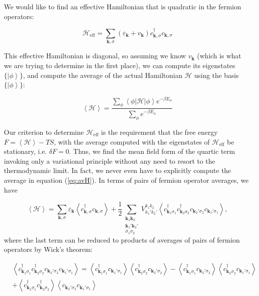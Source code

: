We would like to find an effective Hamiltonian that is quadratic in the fermion operators:

\begin{equation}
\mathcal{H}_{\text{eff}} = \sum_{\bm k, \sigma} (\varepsilon_{\bm k} + v_{\bm k} ) c_{\bm k, \sigma}^\dagger c_{\bm k, \sigma}
\end{equation}

This effective Hamiltonian is diagonal, so assuming we know $v_{\bm k}$ (which is what we are trying to determine in the first place), we can compute its eigenstates $\{ \left| \phi \right\rangle \}$, and compute the average of the actual Hamiltonian $\mathcal{H}$ using the basis $\{ \left| \phi \right\rangle \}$:

\begin{equation}\label{eq:avH}
\left\langle \mathcal{H} \right\rangle = \frac{\sum_\phi \left\langle \phi | \mathcal{H} | \phi \right\rangle e^{-\beta E_\phi} }{\sum_\phi e^{-\beta E_\phi} }
\end{equation}

Our criterion to determine $\mathcal{H}_{\text{eff}}$ is the requirement that the free energy $F = \left\langle \mathcal{H} \right\rangle - TS$, with the average computed with the eigenstates of $\mathcal{H}_{\text{eff}}$ be stationary, i.e. $\delta F = 0$. Thus, we find the mean field form of the quartic term invoking only a variational principle without any need to resort to the thermodynamic limit. In fact, we never even have to explicitly compute the average in equation (\ref{eq:avH}). In terms of pairs of fermion operator averages, we have 

\begin{equation}
\left\langle \mathcal{H} \right\rangle = \sum_{\bm k, \sigma} \varepsilon_{\bm k} \left\langle c_{\bm k, \sigma}^\dagger c_{\bm k, \sigma} \right\rangle + \frac{1}{2} \sum_{\substack{\bm k_1 \bm k_2 \\ \bm k_1' \bm k_2' \\  \sigma_1 \sigma_2}} V_{k_1' k_2'}^{k_1 k_2} \left\langle c_{\bm k_1 \sigma_1}^\dagger c_{\bm k_2 \sigma_2}^\dagger c_{\bm k_2' \sigma_2} c_{\bm k_1' \sigma_1} \right\rangle ,
\end{equation}
where the last term can be reduced to products of averages of pairs of fermion operators by Wick's theorem:

\begin{equation}
\begin{split}
&\left\langle c_{\bm k_1 \sigma_1}^\dagger c_{\bm k_2 \sigma_2}^\dagger c_{\bm k_2' \sigma_2} c_{\bm k_1' \sigma_1} \right\rangle = \left\langle c_{\bm k_1 \sigma_1}^\dagger c_{\bm k_1' \sigma_1} \right\rangle  \left\langle c_{\bm k_2 \sigma_2}^\dagger c_{\bm k_2' \sigma_2} \right\rangle - \left\langle c_{\bm k_1 \sigma_1}^\dagger c_{\bm k_2' \sigma_2} \right\rangle  \left\langle c_{\bm k_2 \sigma_2}^\dagger c_{\bm k_1' \sigma_1} \right\rangle \\
& + \left\langle c_{\bm k_1 \sigma_1}^\dagger c_{\bm k_2 \sigma_2}^\dagger \right\rangle \left\langle c_{\bm k_2' \sigma_2} c_{\bm k_1' \sigma_1} \right\rangle
\end{split}
\end{equation}

